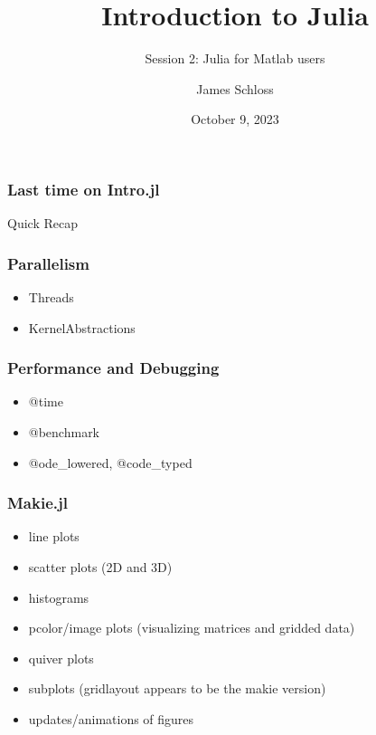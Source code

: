 \documentclass{beamer}
\title[Intro.jl]{Introduction to Julia} %
\subtitle{Session 2: Julia for Matlab users}
\author{James Schloss} %
\institute[LeiosLabs] %
{
\textit{jrs.schloss@gmail.com} %
}
\date{October 9, 2023} %
\begin{document}
\begin{frame}
\vspace*{1.4cm}
\titlepage %
\end{frame}


\begin{frame}
\frametitle{Last time on Intro.jl}
\center \Huge{Quick Recap}
\end{frame}

\begin{frame}
\frametitle{Parallelism}
\begin{itemize}
\item Threads
\item KernelAbstractions
\end{itemize}
\end{frame}

\begin{frame}
\frametitle{Performance and Debugging}
\begin{itemize}
\item @time
\item @benchmark
\item @ode_lowered, @code_typed
\end{itemize}
\end{frame}

\begin{frame}
\frametitle{Makie.jl}

\begin{itemize}
\item line plots
\item scatter plots (2D and 3D)
\item histograms
\item pcolor/image plots (visualizing matrices and gridded data)
\item quiver plots
\item subplots (gridlayout appears to be the makie version)
\item updates/animations of figures
\end{itemize}
\end{frame}
\end{document}
